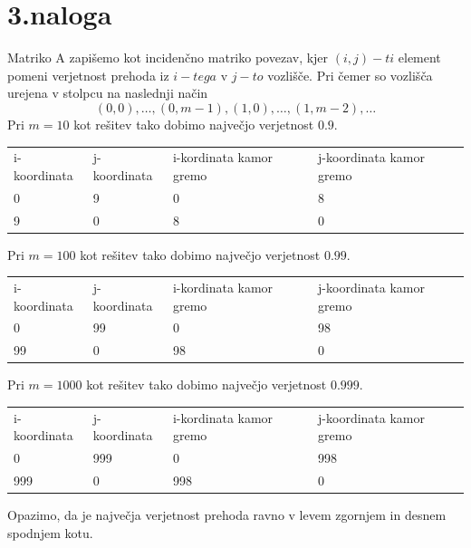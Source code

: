 \documentclass[11pt]{article} %
\begin{document}
\newpage
\section{3.naloga}
Matriko A zapišemo kot incidenčno matriko povezav, kjer $(i,j)-ti$ element pomeni verjetnost prehoda iz $i-tega$ v $j-to$ vozlišče. Pri čemer so vozlišča urejena v stolpcu na naslednji način
$$(0,0),\ldots, (0,m-1), (1,0), \ldots, (1,m-2), \ldots$$
Pri $m=10$ kot rešitev tako dobimo največjo verjetnost $0.9$.

\begin{table}[!htbp]
\centering
\begin{tabular}{llll}
i-koordinata & j-koordinata & i-kordinata kamor gremo & j-koordinata kamor gremo \\
0            & 9            & 0                       & 8                        \\
9            & 0            & 8                       & 0                       
\end{tabular}
\end{table}

Pri $m=100$ kot rešitev tako dobimo največjo verjetnost $0.99$.


\begin{table}[!htbp]
\centering
\begin{tabular}{llll}
i-koordinata & j-koordinata & i-kordinata kamor gremo & j-koordinata kamor gremo \\
0            & 99            & 0                       & 98                        \\
99            & 0            & 98                       & 0                       
\end{tabular}
\end{table}

Pri $m=1000$ kot rešitev tako dobimo največjo verjetnost $0.999$.

\begin{table}[!htbp]
\centering
\begin{tabular}{llll}
i-koordinata & j-koordinata & i-kordinata kamor gremo & j-koordinata kamor gremo \\
0            & 999            & 0                       & 998                        \\
999            & 0            & 998                       & 0                       
\end{tabular}
\end{table}

Opazimo, da je največja verjetnost prehoda ravno v levem zgornjem in desnem spodnjem kotu.
\end{document}
